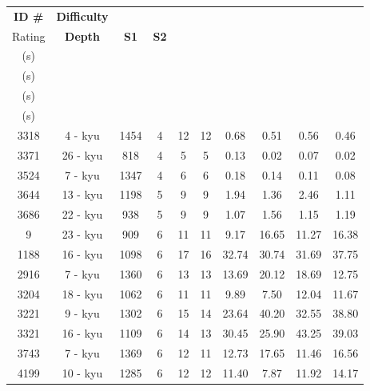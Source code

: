 \documentclass{l4proj}
\begin{document}
\begin{appendices}
\begin{longtable}{|c|c|c|c|c|c|c|c|c|c|}
\hline
\textbf{ID \#} & \textbf{Difficulty} & \textbf{\begin{tabular}[c]{@{}c@{}}Difficulty \\ Rating\end{tabular}} & \textbf{Depth} & \textbf{S1} & \textbf{S2} & \textbf{\begin{tabular}[c]{@{}c@{}}T1 \\ (s)\end{tabular}} & \textbf{\begin{tabular}[c]{@{}c@{}}T2 \\ (s)\end{tabular}} & \textbf{\begin{tabular}[c]{@{}c@{}}T3 \\ (s)\end{tabular}} & \textbf{\begin{tabular}[c]{@{}c@{}}T4 \\ (s)\end{tabular}} \\ \hline
\endfirsthead
%
\endhead
%
3318 & 4 - kyu & 1454 & 4 & 12 & 12 & 0.68 & 0.51 & 0.56 & 0.46 \\ \hline
3371 & 26 - kyu & 818 & 4 & 5 & 5 & 0.13 & 0.02 & 0.07 & 0.02 \\ \hline
3524 & 7 - kyu & 1347 & 4 & 6 & 6 & 0.18 & 0.14 & 0.11 & 0.08 \\ \hline
3644 & 13 - kyu & 1198 & 5 & 9 & 9 & 1.94 & 1.36 & 2.46 & 1.11 \\ \hline
3686 & 22 - kyu & 938 & 5 & 9 & 9 & 1.07 & 1.56 & 1.15 & 1.19 \\ \hline
9 & 23 - kyu & 909 & 6 & 11 & 11 & 9.17 & 16.65 & 11.27 & 16.38 \\ \hline
1188 & 16 - kyu & 1098 & 6 & 17 & 16 & 32.74 & 30.74 & 31.69 & 37.75 \\ \hline
2916 & 7 - kyu & 1360 & 6 & 13 & 13 & 13.69 & 20.12 & 18.69 & 12.75 \\ \hline
3204 & 18 - kyu & 1062 & 6 & 11 & 11 & 9.89 & 7.50 & 12.04 & 11.67 \\ \hline
3221 & 9 - kyu & 1302 & 6 & 15 & 14 & 23.64 & 40.20 & 32.55 & 38.80 \\ \hline
3321 & 16 - kyu & 1109 & 6 & 14 & 13 & 30.45 & 25.90 & 43.25 & 39.03 \\ \hline
3743 & 7 - kyu & 1369 & 6 & 12 & 11 & 12.73 & 17.65 & 11.46 & 16.56 \\ \hline
4199 & 10 - kyu & 1285 & 6 & 12 & 12 & 11.40 & 7.87 & 11.92 & 14.17 \\ \hline

\end{longtable}
\end{appendices}
\end{document}
